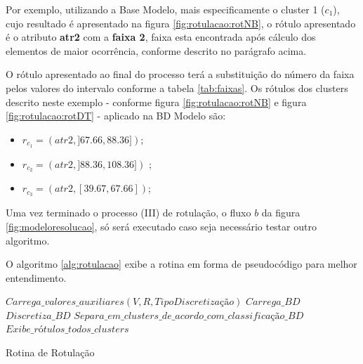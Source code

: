 Por exemplo, utilizando a Base Modelo, mais especificamente o cluster 1 ($c_1$), cujo resultado é apresentado na figura \ref{fig:rotulacao:rotNB}, o rótulo apresentado é o atributo  \textbf{atr2} com a \textbf{faixa 2}, faixa esta encontrada após cálculo dos elementos de maior ocorrência, conforme descrito no parágrafo acima. 

O rótulo apresentado ao final do processo terá a substituição do número da faixa pelos valores do intervalo conforme a tabela \ref{tab:faixas}. Os rótulos dos clusters descrito neste exemplo - conforme figura \ref{fig:rotulacao:rotNB} e figura  \ref{fig:rotulacao:rotDT} - aplicado na BD Modelo são:

\begin{itemize}[noitemsep]
            \item ${r_{c_1}=(atr2,]67.66, 88.36])}$;
            \item ${r_{c_2}=(atr2,]88.36, 108.36])}$ ;
            \item ${r_{c_3}=(atr2,[39.67, 67.66])}$;
            
\end{itemize}


Uma vez terminado o processo (III) de rotulação, o fluxo ${b}$ da figura \ref{fig:modeloresolucao}, só será executado caso seja necessário  testar outro algoritmo.


O algoritmo \ref{alg:rotulacao} exibe a rotina em forma de pseudocódigo para melhor entendimento.

\IncMargin{1em}
\begin{algorithm}[h]

\nl $Carrega\_valores\_auxiliares(V,R,TipoDiscretização)$\;
\nl $Carrega\_BD$\; 
\nl $Discretiza\_BD$\; 
\nl $Separa\_em\_clusters\_de\_acordo\_com\_classificação\_BD$\; 
\nl {}
 \nl $Exibe\_rótulos\_todos\_clusters$\; 
 \caption{Rotina de Rotulação}\label{alg:rotulacao}
 
\end{algorithm}
\DecMargin{1em}
        
